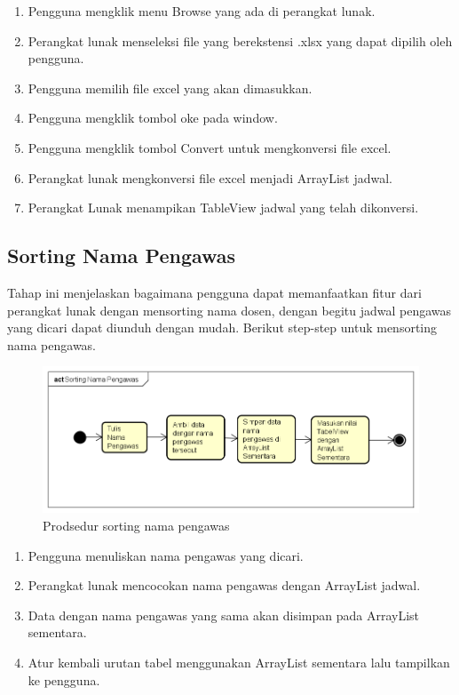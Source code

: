 \begin{enumerate}
	\item Pengguna mengklik menu Browse yang ada di perangkat lunak. 
	\item Perangkat lunak menseleksi file yang berekstensi .xlsx yang dapat dipilih oleh pengguna.
	\item Pengguna memilih file excel yang akan dimasukkan.
	\item Pengguna mengklik tombol oke pada window.
	\item Pengguna mengklik tombol Convert untuk mengkonversi file excel.
	\item Perangkat lunak mengkonversi file excel menjadi ArrayList jadwal.
	\item Perangkat Lunak menampikan TableView jadwal yang telah dikonversi. 
\end{enumerate}

\subsection{Sorting Nama Pengawas}
Tahap ini menjelaskan bagaimana pengguna dapat memanfaatkan fitur dari perangkat lunak dengan mensorting nama dosen, dengan begitu jadwal pengawas yang dicari dapat diunduh dengan mudah. Berikut step-step untuk mensorting nama pengawas.
\begin{figure}[H]
	\centering
	\includegraphics[scale=0.5]{Gambar/Sorting-Nama-Dosen}
	\caption{Prodsedur sorting nama pengawas}
	\end{figure}

\begin{enumerate}
	\item Pengguna menuliskan nama pengawas yang dicari.
	\item Perangkat lunak mencocokan nama pengawas dengan ArrayList jadwal.
	\item Data dengan nama pengawas yang sama akan disimpan pada ArrayList sementara.
	\item Atur kembali urutan tabel menggunakan ArrayList sementara lalu tampilkan ke pengguna.
\end{enumerate}

